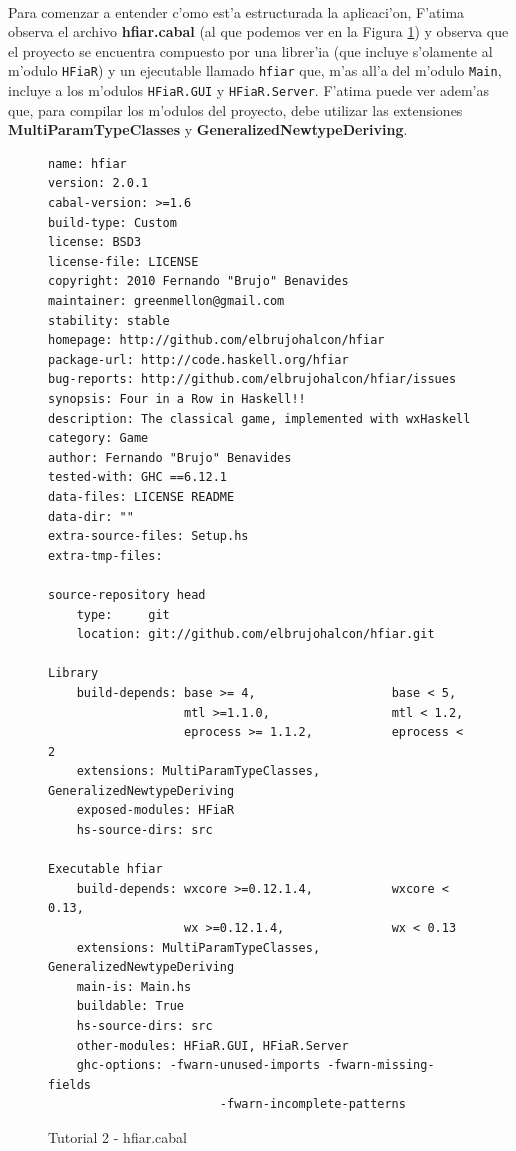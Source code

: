 \documentclass[a4paper]{article}
\begin{document}
\paragraph{}Para comenzar a entender c'omo est'a estructurada la aplicaci'on, F'atima observa el archivo \textbf{hfiar.cabal} (al que podemos ver en la Figura \ref{tut201}) y observa que el proyecto se encuentra compuesto por una librer'ia (que incluye s'olamente al m'odulo \texttt{HFiaR}) y un ejecutable llamado \texttt{hfiar} que, m'as all'a del m'odulo \texttt{Main}, incluye a los m'odulos \texttt{HFiaR.GUI} y \texttt{HFiaR.Server}.  F'atima puede ver adem'as que, para compilar los m'odulos del proyecto, debe utilizar las extensiones \textbf{MultiParamTypeClasses} y \textbf{GeneralizedNewtypeDeriving}.
\begin{figure}[hp]
	\begin{center}
	\hbox{}
		\begin{center}\begin{lstlisting}
name: hfiar
version: 2.0.1
cabal-version: >=1.6
build-type: Custom
license: BSD3
license-file: LICENSE
copyright: 2010 Fernando "Brujo" Benavides
maintainer: greenmellon@gmail.com
stability: stable
homepage: http://github.com/elbrujohalcon/hfiar
package-url: http://code.haskell.org/hfiar
bug-reports: http://github.com/elbrujohalcon/hfiar/issues
synopsis: Four in a Row in Haskell!!
description: The classical game, implemented with wxHaskell
category: Game
author: Fernando "Brujo" Benavides
tested-with: GHC ==6.12.1
data-files: LICENSE README
data-dir: ""
extra-source-files: Setup.hs
extra-tmp-files:

source-repository head
    type:     git
    location: git://github.com/elbrujohalcon/hfiar.git

Library
    build-depends: base >= 4,                   base < 5,
                   mtl >=1.1.0,                 mtl < 1.2,
                   eprocess >= 1.1.2,           eprocess < 2
    extensions: MultiParamTypeClasses, GeneralizedNewtypeDeriving
    exposed-modules: HFiaR
    hs-source-dirs: src

Executable hfiar
    build-depends: wxcore >=0.12.1.4,           wxcore < 0.13,
                   wx >=0.12.1.4,               wx < 0.13
    extensions: MultiParamTypeClasses, GeneralizedNewtypeDeriving
    main-is: Main.hs
    buildable: True
    hs-source-dirs: src
    other-modules: HFiaR.GUI, HFiaR.Server
    ghc-options: -fwarn-unused-imports -fwarn-missing-fields
    					-fwarn-incomplete-patterns
		\end{lstlisting}\end{center}
		\caption{Tutorial 2 - hfiar.cabal}
		\label{tut201}
	\end{center}
\end{figure}
\end{document}

